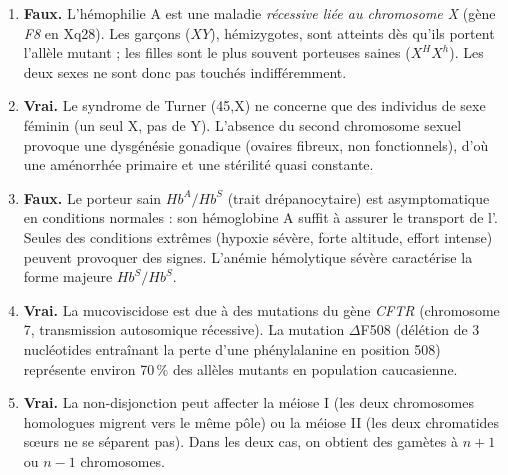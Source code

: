\documentclass[11pt]{article}
\begin{document}
\begin{corrige}
\begin{enumerate}
    \item \textbf{Faux.} L'hémophilie A est une maladie \emph{récessive liée au chromosome X} (gène \emph{F8} en Xq28). Les garçons ($XY$), hémizygotes, sont atteints dès qu'ils portent l'allèle mutant ; les filles sont le plus souvent porteuses saines ($X^H X^h$). Les deux sexes ne sont donc pas touchés indifféremment.
    \item \textbf{Vrai.} Le syndrome de Turner (45,X) ne concerne que des individus de sexe féminin (un seul X, pas de Y). L'absence du second chromosome sexuel provoque une dysgénésie gonadique (ovaires fibreux, non fonctionnels), d'où une aménorrhée primaire et une stérilité quasi constante.
    \item \textbf{Faux.} Le porteur sain $Hb^A/Hb^S$ (trait drépanocytaire) est asymptomatique en conditions normales : son hémoglobine A suffit à assurer le transport de l'. Seules des conditions extrêmes (hypoxie sévère, forte altitude, effort intense) peuvent provoquer des signes. L'anémie hémolytique sévère caractérise la forme majeure $Hb^S/Hb^S$.
    \item \textbf{Vrai.} La mucoviscidose est due à des mutations du gène \emph{CFTR} (chromosome 7, transmission autosomique récessive). La mutation $\Delta$F508 (délétion de 3 nucléotides entraînant la perte d'une phénylalanine en position 508) représente environ 70\,\% des allèles mutants en population caucasienne.
    \item \textbf{Vrai.} La non-disjonction peut affecter la méiose I (les deux chromosomes homologues migrent vers le même pôle) ou la méiose II (les deux chromatides sœurs ne se séparent pas). Dans les deux cas, on obtient des gamètes à $n+1$ ou $n-1$ chromosomes.
\end{enumerate}
\end{corrige}
\end{document}
